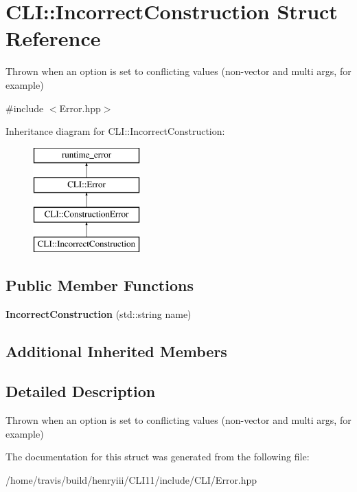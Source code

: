 \hypertarget{struct_c_l_i_1_1_incorrect_construction}{}\section{C\+LI\+:\+:Incorrect\+Construction Struct Reference}
\label{struct_c_l_i_1_1_incorrect_construction}


Thrown when an option is set to conflicting values (non-\/vector and multi args, for example)  




{\ttfamily \#include $<$Error.\+hpp$>$}

Inheritance diagram for C\+LI\+:\+:Incorrect\+Construction\+:\begin{figure}[H]
\begin{center}
\leavevmode
\includegraphics[height=4.000000cm]{struct_c_l_i_1_1_incorrect_construction}
\end{center}
\end{figure}
\subsection*{Public Member Functions}
\begin{DoxyCompactItemize}
\item 
\mbox{\label{struct_c_l_i_1_1_incorrect_construction_a5d605f307996db7e763d02a5038377ff}} 
{\bfseries Incorrect\+Construction} (std\+::string name)
\end{DoxyCompactItemize}
\subsection*{Additional Inherited Members}


\subsection{Detailed Description}
Thrown when an option is set to conflicting values (non-\/vector and multi args, for example) 

The documentation for this struct was generated from the following file\+:\begin{DoxyCompactItemize}
\item 
/home/travis/build/henryiii/\+C\+L\+I11/include/\+C\+L\+I/Error.\+hpp\end{DoxyCompactItemize}
